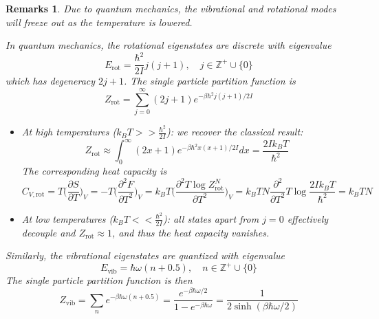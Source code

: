 \documentclass[a4paper]{article}
\newtheorem{remarks}{Remarks}[section]
\theoremstyle{new}
\begin{document}
\begin{remarks}
Due to quantum mechanics, the vibrational and rotational modes will freeze out as the temperature is lowered.
\begin{center}
\end{center}
In quantum mechanics, the rotational eigenstates are discrete with eigenvalue
$$E_{\text{rot}}=\frac{\hbar^2}{2I}j(j+1),\quad j\in\mathbb{Z}^+\cup\{0\}$$
which has degeneracy $2j+1$. The single particle partition function is
$$Z_{\text{rot}}=\sum_{j=0}^\infty(2j+1)e^{-\beta\hbar^2j(j+1)/2I}$$
\begin{itemize}
    \item At high temperatures ($k_BT>>\frac{\hbar^2}{2I}$): we recover the classical result:
$$Z_{\text{rot}}\approx\int_0^\infty (2x+1)e^{-\beta\hbar^2x(x+1)/2I}dx=\frac{2Ik_BT}{\hbar^2}$$
The corresponding heat capacity is
$$C_{V,\text{rot}}=T\bigg(\frac{\partial S}{\partial T}\bigg)_V=-T\bigg(\frac{\partial^2F}{\partial T^2}\bigg)_V=k_BT\bigg(\frac{\partial^2T\log Z_{\text{rot}}^N}{\partial T^2}\bigg)_V=k_BTN\frac{\partial^2}{\partial T^2}T\log\frac{2Ik_BT}{\hbar^2}=k_BTN$$
\item At low temperatures ($k_BT<<\frac{\hbar^2}{2I}$):
 all states apart from $j=0$ effectively decouple and $Z_{\text{rot}}\approx1$, and thus the heat capacity vanishes.
 \end{itemize}
Similarly, the vibrational eigenstates are quantized with eigenvalue
$$E_{\text{vib}}=\hbar\omega(n+0.5),\quad n\in\mathbb{Z}^+\cup\{0\}$$
The single particle partition function is then
$$Z_{\text{vib}}=\sum_ne^{-\beta\hbar\omega(n+0.5)}=\frac{e^{-\beta\hbar\omega/2}}{1-e^{-\beta\hbar\omega}}=\frac{1}{2\sinh(\beta\hbar\omega/2)}$$

\end{remarks}
\end{document}
